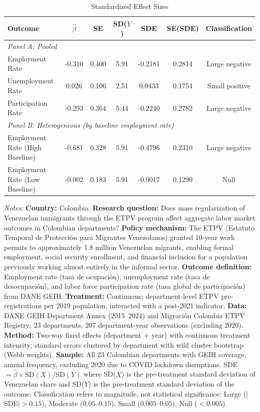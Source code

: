 \begin{table}[htbp]
\centering
\caption{Standardized Effect Sizes}
\label{tab:sde}
\begin{threeparttable}
\footnotesize
\begin{tabular}{lcccccc}
\hline\hline
Outcome & $\hat{\beta}$ & SE & SD($Y$) & SDE & SE(SDE) & Classification \\
\hline
\multicolumn{7}{l}{\textit{Panel A: Pooled}} \\
\hline
Employment Rate & -0.310 & 0.400 & 5.91 & -0.2181 & 0.2814 & Large negative \\
Unemployment Rate & 0.026 & 0.106 & 2.51 & 0.0433 & 0.1754 & Small positive \\
Participation Rate & -0.293 & 0.364 & 5.44 & -0.2240 & 0.2782 & Large negative \\
\hline
\multicolumn{7}{l}{\textit{Panel B: Heterogeneous (by baseline employment rate)}} \\
\hline
Employment Rate (High Baseline) & -0.681 & 0.328 & 5.91 & -0.4796 & 0.2310 & Large negative \\
Employment Rate (Low Baseline) & -0.002 & 0.183 & 5.91 & -0.0017 & 0.1290 & Null \\
\hline\hline
\end{tabular}
\begin{tablenotes}[flushleft]
\small
\item \textit{Notes:} \textbf{Country:} Colombia. \textbf{Research question:} Does mass regularization of Venezuelan immigrants through the ETPV program affect aggregate labor market outcomes in Colombian departments? \textbf{Policy mechanism:} The ETPV (Estatuto Temporal de Protecci\'on para Migrantes Venezolanos) granted 10-year work permits to approximately 1.8 million Venezuelan migrants, enabling formal employment, social security enrollment, and financial inclusion for a population previously working almost entirely in the informal sector. \textbf{Outcome definition:} Employment rate (tasa de ocupaci\'on), unemployment rate (tasa de desocupaci\'on), and labor force participation rate (tasa global de participaci\'on) from DANE GEIH. \textbf{Treatment:} Continuous; department-level ETPV pre-registrations per 2019 population, interacted with a post-2021 indicator. \textbf{Data:} DANE GEIH Department Annex (2015--2024) and Migraci\'on Colombia ETPV Registry; 23 departments, 207 department-year observations (excluding 2020). \textbf{Method:} Two-way fixed effects (department + year) with continuous treatment intensity; standard errors clustered by department with wild cluster bootstrap (Webb weights). \textbf{Sample:} All 23 Colombian departments with GEIH coverage, annual frequency, excluding 2020 due to COVID lockdown disruptions. SDE $= \hat{\beta} \times \text{SD}(X) / \text{SD}(Y)$ where SD($X$) is the pre-treatment standard deviation of Venezuelan share and SD($Y$) is the pre-treatment standard deviation of the outcome. Classification refers to magnitude, not statistical significance: Large ($|$SDE$| > 0.15$), Moderate ($0.05$--$0.15$), Small ($0.005$--$0.05$), Null ($< 0.005$).
\end{tablenotes}
\end{threeparttable}
\end{table}

